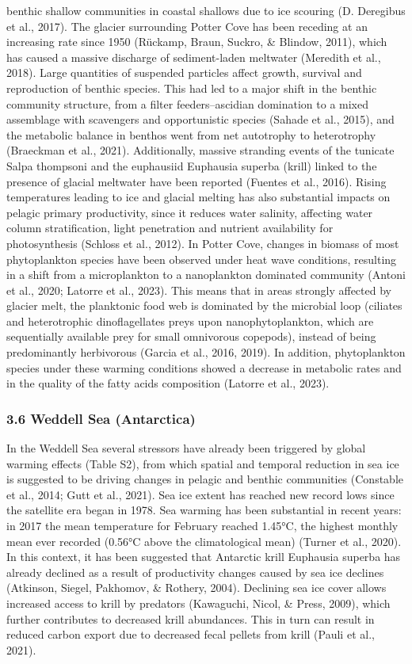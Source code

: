 \documentclass[
]{article}
\begin{document}
benthic shallow communities in coastal shallows due to ice scouring (D.
Deregibus et al., 2017). The glacier surrounding Potter Cove has been
receding at an increasing rate since 1950 (Rückamp, Braun, Suckro, \&
Blindow, 2011), which has caused a massive discharge of sediment-laden
meltwater (Meredith et al., 2018). Large quantities of suspended
particles affect growth, survival and reproduction of benthic species.
This had led to a major shift in the benthic community structure, from a
filter feeders--ascidian domination to a mixed assemblage with
scavengers and opportunistic species (Sahade et al., 2015), and the
metabolic balance in benthos went from net autotrophy to heterotrophy
(Braeckman et al., 2021). Additionally, massive stranding events of the
tunicate Salpa thompsoni and the euphausiid Euphausia superba (krill)
linked to the presence of glacial meltwater have been reported (Fuentes
et al., 2016). Rising temperatures leading to ice and glacial melting
has also substantial impacts on pelagic primary productivity, since it
reduces water salinity, affecting water column stratification, light
penetration and nutrient availability for photosynthesis (Schloss et
al., 2012). In Potter Cove, changes in biomass of most phytoplankton
species have been observed under heat wave conditions, resulting in a
shift from a microplankton to a nanoplankton dominated community (Antoni
et al., 2020; Latorre et al., 2023). This means that in areas strongly
affected by glacier melt, the planktonic food web is dominated by the
microbial loop (ciliates and heterotrophic dinoflagellates preys upon
nanophytoplankton, which are sequentially available prey for small
omnivorous copepods), instead of being predominantly herbivorous (Garcia
et al., 2016, 2019). In addition, phytoplankton species under these
warming conditions showed a decrease in metabolic rates and in the
quality of the fatty acids composition (Latorre et al., 2023).

\hypertarget{weddell-sea-antarctica}{%
\subsubsection{3.6 Weddell Sea
(Antarctica)}\label{weddell-sea-antarctica}}

In the Weddell Sea several stressors have already been triggered by
global warming effects (Table S2), from which spatial and temporal
reduction in sea ice is suggested to be driving changes in pelagic and
benthic communities (Constable et al., 2014; Gutt et al., 2021). Sea ice
extent has reached new record lows since the satellite era began in
1978. Sea warming has been substantial in recent years: in 2017 the mean
temperature for February reached 1.45°C, the highest monthly mean ever
recorded (0.56°C above the climatological mean) (Turner et al., 2020).
In this context, it has been suggested that Antarctic krill Euphausia
superba has already declined as a result of productivity changes caused
by sea ice declines (Atkinson, Siegel, Pakhomov, \& Rothery, 2004).
Declining sea ice cover allows increased access to krill by predators
(Kawaguchi, Nicol, \& Press, 2009), which further contributes to
decreased krill abundances. This in turn can result in reduced carbon
export due to decreased fecal pellets from krill (Pauli et al., 2021).
\end{document}
